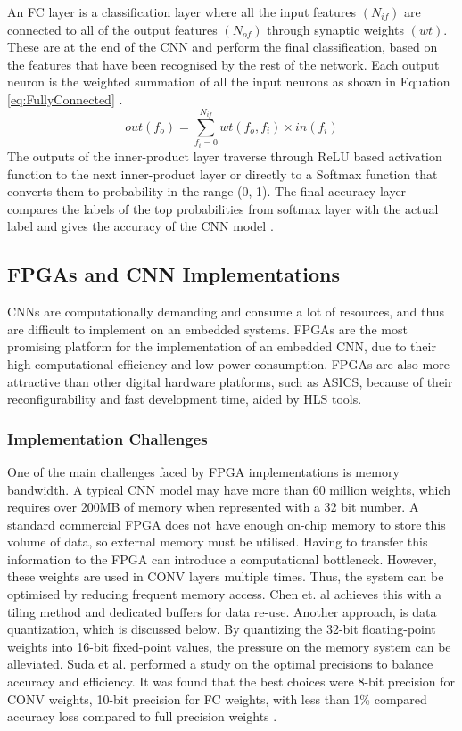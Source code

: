 \documentclass[12pt]{article}
\begin{document}
An FC layer is a classification layer where all the input features $(N_{if})$ are connected to all of the output features $(N_{of})$ through synaptic weights $(wt)$. These are at the end of the CNN and perform the final classification, based on the features that have been recognised by the rest of the network. Each output neuron is the weighted summation of all the input neurons as shown in Equation \ref{eq:FullyConnected} \cite{SudaFpgaAccelerator}.
\begin{equation}
out(f_o)=\sum^{N_{if}}_{f_i=0}wt(f_o,f_i)\times in(f_i)
\label{eq:FullyConnected}
\end{equation}
The outputs of the inner-product layer traverse through ReLU based activation function to the next inner-product layer or directly to a Softmax function that converts them to probability in the range (0, 1). The final accuracy layer compares the labels of the top probabilities from softmax layer with the actual label and gives the accuracy of the CNN model \cite{SudaFpgaAccelerator}.

\subsection{FPGAs and CNN Implementations}
\label{sec:Background-FpgaCnnImpl}


CNNs are computationally demanding and consume a lot of resources, and thus are difficult to implement on an embedded systems. FPGAs are the most promising platform for the implementation of an embedded CNN, due to their high computational efficiency and low power consumption. FPGAs are also more attractive than other digital hardware platforms, such as ASICS, because of their reconfigurability and fast development time, aided by HLS tools.

\subsubsection{Implementation Challenges}
\label{sec:Background-FpgaCnnImpl-Challenges}


One of the main challenges faced by FPGA implementations is memory bandwidth. A typical CNN model may have more than 60 million weights, which requires over 200MB of memory when represented with a 32 bit number. A standard commercial FPGA does not have enough on-chip memory to store this volume of data, so external memory must be utilised. Having to transfer this information to the FPGA can introduce a computational bottleneck. However, these weights are used in CONV layers multiple times. Thus, the system can be optimised by reducing frequent memory access. Chen et. al achieves this with a tiling method and dedicated buffers for data re-use. Another approach, is data quantization, which is discussed below. By quantizing the 32-bit floating-point weights into 16-bit fixed-point values, the pressure on the memory system can be alleviated. Suda et al. performed a study on the optimal precisions to balance accuracy and efficiency. It was found that the best choices were 8-bit precision for CONV weights, 10-bit precision for FC weights, with less than 1\% compared accuracy loss compared to full precision weights \cite{SudaFpgaAccelerator}.
\end{document}
